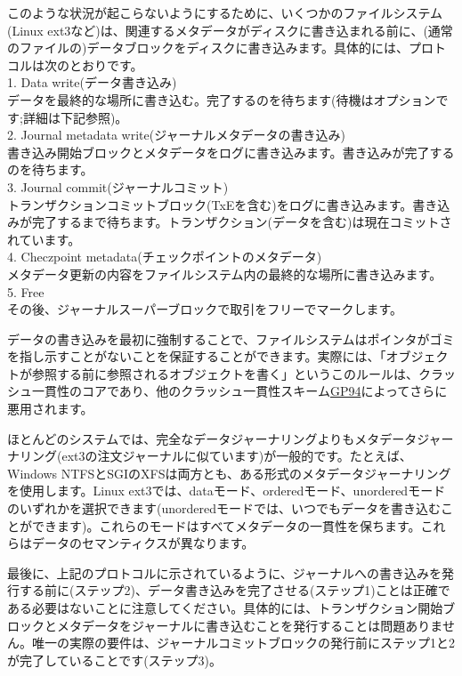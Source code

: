 このような状況が起こらないようにするために、いくつかのファイルシステム(Linux
ext3など)は、関連するメタデータがディスクに書き込まれる前に、(通常のファイルの)データブロックをディスクに書き込みます。具体的には、プロトコルは次のとおりです。\\
1. Data write(データ書き込み)\\
データを最終的な場所に書き込む。完了するのを待ちます(待機はオプションです;詳細は下記参照)。\\
2. Journal metadata write(ジャーナルメタデータの書き込み)\\
書き込み開始ブロックとメタデータをログに書き込みます。書き込みが完了するのを待ちます。\\
3. Journal commit(ジャーナルコミット)\\
トランザクションコミットブロック(TxEを含む)をログに書き込みます。書き込みが完了するまで待ちます。トランザクション(データを含む)は現在コミットされています。\\
4. Checzpoint metadata(チェックポイントのメタデータ)\\
メタデータ更新の内容をファイルシステム内の最終的な場所に書き込みます。\\
5. Free\\
その後、ジャーナルスーパーブロックで取引をフリーでマークします。

データの書き込みを最初に強制することで、ファイルシステムはポインタがゴミを指し示すことがないことを保証することができます。実際には、「オブジェクトが参照する前に参照されるオブジェクトを書く」というこのルールは、クラッシュ一貫性のコアであり、他のクラッシュ一貫性スキーム\href{詳細は以下を参照}{GP94}によってさらに悪用されます。

ほとんどのシステムでは、完全なデータジャーナリングよりもメタデータジャーナリング(ext3の注文ジャーナルに似ています)が一般的です。たとえば、Windows
NTFSとSGIのXFSは両方とも、ある形式のメタデータジャーナリングを使用します。Linux
ext3では、dataモード、orderedモード、unorderedモードのいずれかを選択できます(unorderedモードでは、いつでもデータを書き込むことができます)。これらのモードはすべてメタデータの一貫性を保ちます。これらはデータのセマンティクスが異なります。

最後に、上記のプロトコルに示されているように、ジャーナルへの書き込みを発行する前に(ステップ2)、データ書き込みを完了させる(ステップ1)ことは正確である必要はないことに注意してください。具体的には、トランザクション開始ブロックとメタデータをジャーナルに書き込むことを発行することは問題ありません。唯一の実際の要件は、ジャーナルコミットブロックの発行前にステップ1と2が完了していることです(ステップ3)。

